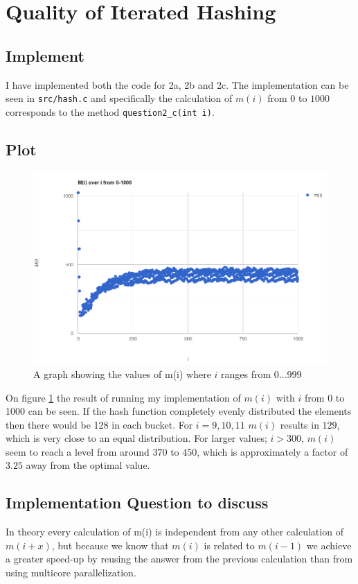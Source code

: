\section{Quality of Iterated Hashing}
\subsection{Implement}
I have implemented both the code for 2a, 2b and 2c. The implementation can be seen in \texttt{src/hash.c} and specifically the calculation of $m(i)$ from $0$ to $1000$ corresponds to the method \texttt{question2\_c(int i)}.

\subsection{Plot}
\begin{figure}[H]
	\includegraphics[width=\linewidth]{figures/question2_plot.png}
	\caption{A graph showing the values of m(i) where $i$ ranges from $0...999$}
	\label{graph:question2_plot}
\end{figure}

On figure \ref{graph:question2_plot} the result of running my implementation of $m(i)$ with $i$ from 0 to 1000 can be seen. If the hash function completely evenly distributed the elements then there would be 128 in each bucket. For $i=9,10,11$ $m(i)$ results in $129$, which is very close to an equal distribution. For larger values; $i>300$, $m(i)$ seem to reach a level from around $370$ to $450$, which is approximately a factor of $3.25$ away from the optimal value. 

\subsection{Implementation Question to discuss}
In theory every calculation of m(i) is independent from any other calculation of $m(i+x)$, but because we know that $m(i)$ is related to $m(i-1)$ we achieve a greater speed-up by reusing the answer from the previous calculation than from using multicore parallelization. 

